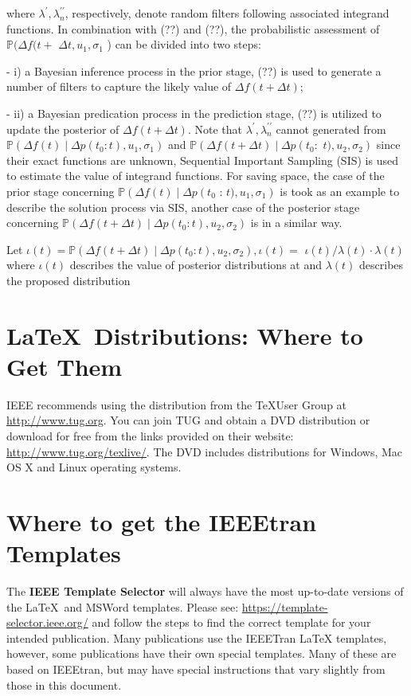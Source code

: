 \documentclass[lettersize,journal]{IEEEtran}
\begin{document}
where $\lambda^{\prime}, \lambda_{n}^{\prime \prime}$, respectively, denote random filters following associated integrand functions. In combination with (??) and (??), the probabilistic assessment of $\mathbb{P}(\Delta f(t+$ $\Delta t, u_{1}, \sigma_{1}$ ) can be divided into two steps:

- i) a Bayesian inference process in the prior stage, (??) is used to generate a number of filters to capture the likely value of $\Delta f(t+\Delta t)$;

- ii) a Bayesian predication process in the prediction stage, (??) is utilized to update the posterior of $\Delta f(t+\Delta t)$. Note that $\lambda^{\prime}, \lambda_{n}^{\prime \prime}$ cannot generated from $\mathbb{P}\left(\Delta f(t) \mid \Delta p\left(t_{0}: t\right), u_{1}, \sigma_{1}\right)$ and $\mathbb{P}\left(\Delta f(t+\Delta t) \mid \Delta p\left(t_{0}:\right.\right.$ $\left.t), u_{2}, \sigma_{2}\right)$ since their exact functions are unknown, Sequential Important Sampling (SIS) is used to estimate the value of integrand functions. For saving space, the case of the prior stage concerning $\mathbb{P}\left(\Delta f(t) \mid \Delta p\left(t_{0}\right.\right.$ : $\left.t), u_{1}, \sigma_{1}\right)$ is took as an example to describe the solution process via SIS, another case of the posterior stage concerning $\mathbb{P}\left(\Delta f(t+\Delta t) \mid \Delta p\left(t_{0}: t\right), u_{2}, \sigma_{2}\right)$ is in a similar way.

Let $\iota(t)=\mathbb{P}\left(\Delta f(t+\Delta t) \mid \Delta p\left(t_{0}: t\right), u_{2}, \sigma_{2}\right), \iota(t)=$ $\iota(t) / \lambda(t) \cdot \lambda(t)$ where $\iota(t)$ describes the value of posterior distributions at and $\lambda(t)$ describes the proposed distribution

\section{\LaTeX \ Distributions: Where to Get Them}
\noindent IEEE recommends using the distribution from the \TeX User Group at \url{http://www.tug.org}. You can join TUG and obtain a DVD distribution or download for free  from the links provided on their website: \url{http://www.tug.org/texlive/}. The DVD includes distributions for Windows, Mac OS X and Linux operating systems.
 
\section{Where to get the IEEEtran Templates}
\noindent The {\bf{IEEE Template Selector}} will always have the most up-to-date versions of the \LaTeX\ and MSWord templates. Please see: \url{https://template-selector.ieee.org/} and follow the steps to find the correct template for your intended publication. Many publications use the IEEETran LaTeX templates, however, some publications have their own special templates. Many of these are  based on IEEEtran, but may have special instructions that vary slightly from those in this document.
\end{document}
